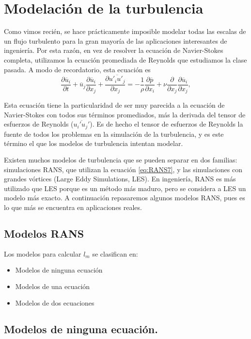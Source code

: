 \section*{Modelación de la turbulencia}

Como vimos recién, se hace prácticamente imposible modelar todas las escalas de un flujo turbulento para la gran mayoría de las aplicaciones interesantes de ingeniería.
Por esta razón, en vez de resolver la ecuación de Navier-Stokes completa, utilizamos la ecuación promediada de Reynolds que estudiamos la clase pasada. 
A modo de recordatorio, esta ecuación es
%
\begin{equation}\label{eq:RANS7}
\frac{\partial \overline{u}_i}{\partial t} + \overline{u}_j\frac{\partial \overline{u}_i}{\partial x_j} + \frac{\partial \overline{u'_iu'_j}}{\partial x_j} = -\frac{1}{\rho}\frac{\partial \overline{p}}{\partial x_i} + \nu \frac{\partial}{\partial x_j}\frac{\partial \overline{u}_i}{\partial x_j},
\end{equation}

Esta ecuación tiene la particularidad de ser muy parecida a la ecuación de Navier-Stokes con todos sus términos promediados, más la derivada del tensor de esfuerzos de Reynolds ($\overline{u_i'u_j'}$).
Es de hecho el tensor de esfuerzos de Reynolds la fuente de todos los problemas en la simulación de la turbulencia, y es este término el que los modelos de turbulencia intentan modelar.

Existen muchos modelos de turbulencia que se pueden separar en dos familias: simulaciones RANS, que utilizan la ecuación \eqref{eq:RANS7}, y las simulaciones con grandes vórtices (Large Eddy Simulations, LES).
En ingeniería, RANS es más utilizado que LES porque es un método más maduro, pero se considera a LES un modelo más exacto.
A continuación repasaremos algunos modelos RANS, pues es lo que más se encuentra en aplicaciones reales.

\subsection*{Modelos RANS}
Los modelos para calcular $l_m$ se clasifican en:
%
\begin{itemize}
\item Modelos de ninguna ecuación
\item Modelos de una ecuación
\item Modelos de dos ecuaciones
\end{itemize}


\subsection*{Modelos de ninguna ecuación.}
